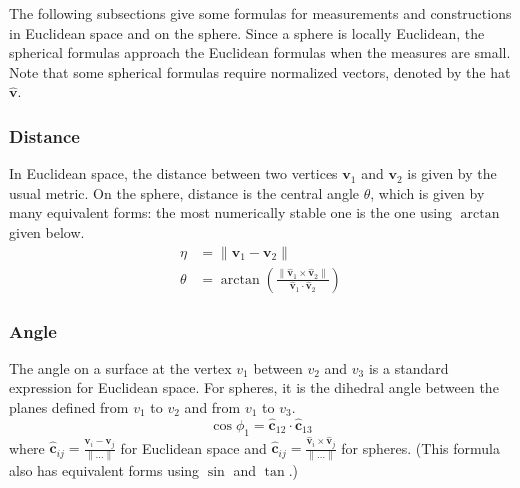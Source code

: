 \documentclass{amsart}[12pt]
\begin{document}
The following subsections give some formulas for measurements and constructions
in Euclidean space and on the sphere. Since a sphere is locally Euclidean, the
spherical formulas approach the Euclidean formulas when the measures are small.
Note that some spherical formulas require normalized vectors,
denoted by the hat $\mathbf{\hat{v}}$.

\subsubsection{Distance}
In Euclidean space, the distance between two vertices $\mathbf v_1$ and
$\mathbf v_2$ is given by the usual metric. On the sphere, distance is the
central angle $\theta$, which is given by many equivalent forms: the most
numerically stable one is the one using $\arctan$ given below.
\begin{equation}\begin{split}
\eta & = \|\mathbf v_1-\mathbf v_2\| \\
\theta & = \arctan\left(
  \frac{\|\mathbf{\hat{v}}_1 \times \mathbf{\hat{v}}_2\|}
  {\mathbf{\hat{v}}_1 \cdot \mathbf{\hat{v}}_2}\right)
\end{split}\end{equation}

\subsubsection{Angle}
The angle on a surface at the vertex $v_1$ between $v_2$ and $v_3$ is a
standard expression for Euclidean space. For spheres, it is the dihedral angle
between the planes defined from $v_1$ to $v_2$ and from $v_1$ to $v_3$.
\begin{equation}
  \cos\phi_1 = \mathbf{\hat{c}}_{12} \cdot \mathbf{\hat{c}}_{13}
\end{equation}
where $\mathbf{\hat{c}}_{ij} = \frac{\mathbf{v}_i - \mathbf{v}_j}{\|\dots\|}$
for Euclidean space and $\mathbf{\hat{c}}_{ij} = \frac{\mathbf{\hat{v}}_i
\times \mathbf{\hat{v}}_j}{\|\dots\|}$ for spheres. (This formula also has
equivalent forms using $\sin$ and $\tan$.)
\end{document}
